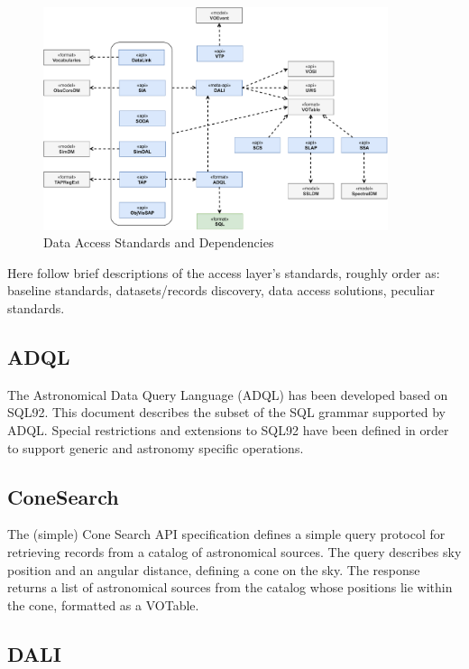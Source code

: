 \documentclass[11pt,a4paper]{ivoa}
\begin{document}
\begin{figure}[h]
\centering
\includegraphics[width=0.90\textwidth]{ivoa-arch-dal.pdf}
\caption{Data Access Standards and Dependencies}
\label{fig:daldeps}
\end{figure}

Here follow brief descriptions of the access layer's standards, roughly
order as: baseline standards, datasets/records discovery, data access
solutions, peculiar standards.

\subsection{ADQL}

The Astronomical Data Query Language (ADQL) \citep{2008ivoa.spec.1030O} has been developed based on SQL92. This document 
describes the subset of the SQL grammar supported by ADQL. Special restrictions and 
extensions to SQL92 have been defined in order to support generic and astronomy 
specific operations. 

\subsection{ConeSearch}

The (simple) Cone Search \citep{2008ivoa.specQ0222P} API specification defines a simple query protocol for retrieving 
records from a catalog of astronomical sources. The query describes sky position and an 
angular distance, defining a cone on the sky. The response returns a list of astronomical 
sources from the catalog whose positions lie within the cone, formatted as a VOTable. 

\subsection{DALI}
\label{dal:dali}
\end{document}
